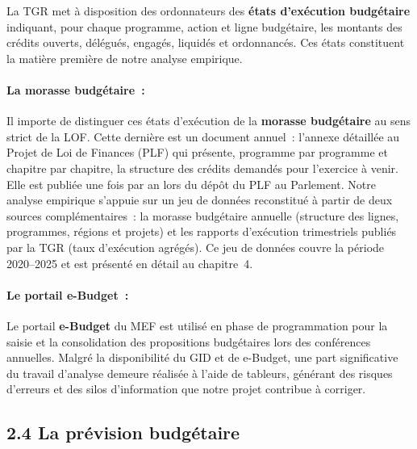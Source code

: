 La TGR met \`a disposition des ordonnateurs des \textbf{\'etats d'ex\'ecution budg\'etaire} indiquant, pour chaque programme, action et ligne budg\'etaire, les montants des cr\'edits ouverts, d\'el\'egu\'es, engag\'es, liquid\'es et ordonnanc\'es. Ces \'etats constituent la mati\`ere premi\`ere de notre analyse empirique.

\paragraph{La morasse budg\'etaire~:}

Il importe de distinguer ces \'etats d'ex\'ecution de la \textbf{morasse budg\'etaire} au sens strict de la LOF. Cette derni\`ere est un document annuel~: l'annexe d\'etaill\'ee au Projet de Loi de Finances (PLF) qui pr\'esente, programme par programme et chapitre par chapitre, la structure des cr\'edits demand\'es pour l'exercice \`a venir. Elle est publi\'ee une fois par an lors du d\'ep\^ot du PLF au Parlement. Notre analyse empirique s'appuie sur un jeu de donn\'ees reconstitu\'e \`a partir
de deux sources compl\'ementaires~: la morasse budg\'etaire annuelle (structure des
lignes, programmes, r\'egions et projets) et les rapports d'ex\'ecution trimestriels
publi\'es par la TGR (taux d'ex\'ecution agr\'eg\'es). Ce jeu de donn\'ees couvre
la p\'eriode 2020--2025 et est pr\'esent\'e en d\'etail au chapitre~4.

\paragraph{Le portail e-Budget~:}

Le portail \textbf{e-Budget} du MEF est utilis\'e en phase de programmation pour la saisie et la consolidation des propositions budg\'etaires lors des conf\'erences annuelles. Malgr\'e la disponibilit\'e du GID et de e-Budget, une part significative du travail d'analyse demeure r\'ealis\'ee \`a l'aide de tableurs, g\'en\'erant des risques d'erreurs et des silos d'information que notre projet contribue \`a corriger.

\subsection*{2.4 \quad La pr\'evision budg\'etaire}

